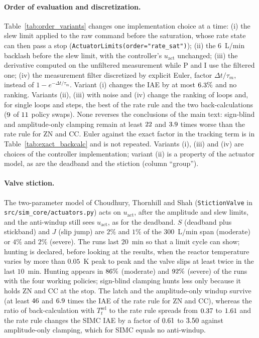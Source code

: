 \documentclass[11pt]{article}
\begin{document}
\paragraph{Order of evaluation and discretization.} Table~\ref{tab:order_variants} changes one implementation choice at a time: (i) the slew limit applied to the raw command before the saturation, whose rate state can then pass a stop (\texttt{ActuatorLimits(order="rate\_sat")}); (ii) the $6$~L/min backlash before the slew limit, with the controller's $u_{\text{act}}$ unchanged; (iii) the derivative computed on the unfiltered measurement while P and I use the filtered one; (iv) the measurement filter discretized by explicit Euler, factor $\Delta t/\tau_m$, instead of $1 - e^{-\Delta t/\tau_m}$. Variant (i) changes the IAE by at most $6.3\%$ and no ranking. Variants (ii), (iii) with noise and (iv) change the ranking of loops and, for single loops and steps, the best of the rate rule and the two back-calculations ($9$ of $11$ policy swaps). None reverses the conclusions of the main text: sign-blind and amplitude-only clamping remain at least $22$ and $3.9$ times worse than the rate rule for ZN and CC. Euler against the exact factor in the tracking term is in Table~\ref{tab:exact_backcalc} and is not repeated. Variants (i), (iii) and (iv) are choices of the controller implementation; variant (ii) is a property of the actuator model, as are the deadband and the stiction (column ``group'').



\paragraph{Valve stiction.} The two-parameter model of Choudhury, Thornhill and Shah \cite{choudhury2005modelling} (\texttt{StictionValve} in \texttt{src/sim\_core/actuators.py}) acts on $u_{\text{act}}$, after the amplitude and slew limits, and the anti-windup still sees $u_{\text{act}}$, as for the deadband. $S$ (deadband plus stickband) and $J$ (slip jump) are $2\%$ and $1\%$ of the $300$~L/min span (moderate) or $4\%$ and $2\%$ (severe). The runs last $20$~min so that a limit cycle can show; hunting is declared, before looking at the results, when the reactor temperature varies by more than $0.05$~K peak to peak and the valve slips at least twice in the last $10$~min. Hunting appears in $86\%$ (moderate) and $92\%$ (severe) of the runs with the four working policies; sign-blind clamping hunts less only because it holds ZN and CC at the stop. The latch and the amplitude-only windup survive (at least $46$ and $6.9$ times the IAE of the rate rule for ZN and CC), whereas the ratio of back-calculation with $T_t^{\mathrm{sel}}$ to the rate rule spreads from $0.37$ to $1.61$ and the rate rule changes the SIMC IAE by a factor of $0.61$ to $3.50$ against amplitude-only clamping, which for SIMC equals no anti-windup.
\end{document}
